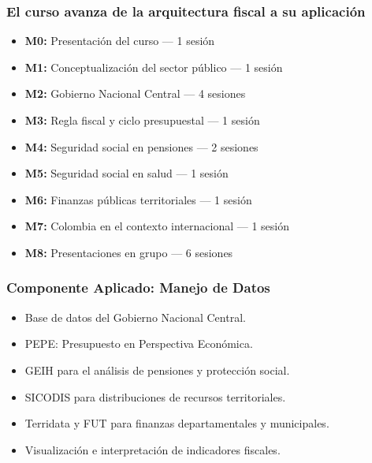 \documentclass{beamer}
\begin{document}
\begin{frame}
  \frametitle{El curso avanza de la arquitectura fiscal a su aplicaci\'on}
  \small
  \begin{itemize}
    \item \textbf{M0:} Presentaci\'on del curso --- 1 sesi\'on
    \item \textbf{M1:} Conceptualizaci\'on del sector p\'ublico --- 1 sesi\'on
    \item \textbf{M2:} Gobierno Nacional Central --- 4 sesiones
    \item \textbf{M3:} Regla fiscal y ciclo presupuestal --- 1 sesi\'on
    \item \textbf{M4:} Seguridad social en pensiones --- 2 sesiones
    \item \textbf{M5:} Seguridad social en salud --- 1 sesi\'on
    \item \textbf{M6:} Finanzas p\'ublicas territoriales --- 1 sesi\'on
    \item \textbf{M7:} Colombia en el contexto internacional --- 1 sesi\'on
    \item \textbf{M8:} Presentaciones en grupo --- 6 sesiones
  \end{itemize}
\end{frame}

\begin{frame}
  \frametitle{Componente Aplicado: Manejo de Datos}
  \begin{itemize}
    \item Base de datos del Gobierno Nacional Central.
    \item PEPE: Presupuesto en Perspectiva Econ\'omica.
    \item GEIH para el an\'alisis de pensiones y protecci\'on social.
    \item SICODIS para distribuciones de recursos territoriales.
    \item Terridata y FUT para finanzas departamentales y municipales.
    \item Visualizaci\'on e interpretaci\'on de indicadores fiscales.
  \end{itemize}
\end{frame}
\end{document}

